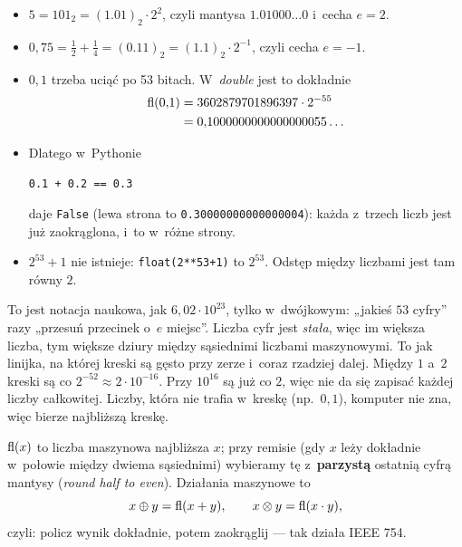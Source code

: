 \documentclass[11pt]{article}
\begin{document}
\begin{przyklad}
\begin{itemize}
\item $5=101_2=(1.01)_2\cdot2^2$, czyli mantysa $1.01000\ldots0$
i~cecha $e=2$.
\item $0{,}75=\tfrac12+\tfrac14=(0.11)_2=(1.1)_2\cdot2^{-1}$, czyli
cecha $e=-1$.
\item $0{,}1$ trzeba uciąć po 53 bitach. W~\emph{double} jest to
dokładnie
\begin{align*}
\operatorname{fl}(0{,}1)&=3602879701896397\cdot2^{-55}\\
&=0{,}1000000000000000055\ldots
\end{align*}
\item Dlatego w~Pythonie
\begin{center}\texttt{0.1 + 0.2 == 0.3}\end{center}
daje \texttt{False} (lewa strona to \texttt{0.30000000000000004}):
każda z~trzech liczb jest już zaokrąglona, i~to w~różne strony.
\item $2^{53}+1$ nie istnieje: \texttt{float(2**53+1)} to $2^{53}$.
Odstęp między liczbami jest tam równy $2$.
\end{itemize}
\end{przyklad}

\begin{poludzku}
To jest notacja naukowa, jak $6{,}02\cdot10^{23}$, tylko w~dwójkowym:
„jakieś $53$ cyfry” razy „przesuń przecinek o~$e$ miejsc”. Liczba cyfr
jest \emph{stała}, więc im większa liczba, tym większe dziury między
sąsiednimi liczbami maszynowymi. To jak linijka, na której kreski są
gęsto przy zerze i~coraz rzadziej dalej. Między $1$ a~$2$ kreski są co
$2^{-52}\approx2\cdot10^{-16}$. Przy $10^{16}$ są już co $2$, więc nie da
się zapisać każdej liczby całkowitej. Liczby, która nie trafia w~kreskę
(np.\ $0{,}1$), komputer nie zna, więc bierze najbliższą kreskę.
\end{poludzku}

\begin{definicja}
$\operatorname{fl}(x)$ to liczba maszynowa najbliższa $x$; przy remisie (gdy $x$ leży
dokładnie w~połowie między dwiema sąsiednimi) wybieramy tę z~\textbf{parzystą}
ostatnią cyfrą mantysy (\emph{round half to even}). Działania maszynowe to
\[
x\mathbin{\oplus} y=\operatorname{fl}(x+y),\qquad x\mathbin{\otimes} y=\operatorname{fl}(x\cdot y),
\]
czyli: policz wynik dokładnie, potem zaokrąglij --- tak działa IEEE 754.
\end{definicja}
\end{document}
